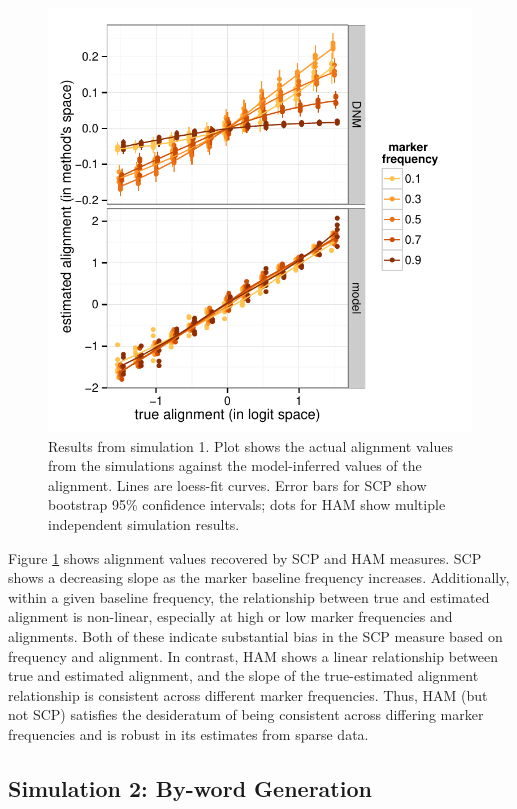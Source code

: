 \documentclass{acm_proc_article-sp}
\begin{document}
\begin{figure}[t]
\centering
\includegraphics[width=\columnwidth]{graphics/www2016_simulation1_crossiter.pdf}
\caption{Results from simulation 1. Plot shows the actual alignment values from the simulations against the model-inferred values of the alignment. Lines are loess-fit curves. Error bars for SCP show bootstrap 95\% confidence intervals; dots for HAM show multiple independent simulation results.}\label{fig:sim1}
\end{figure}

Figure \ref{fig:sim1} shows alignment values recovered by SCP and HAM measures. SCP shows a decreasing slope as the marker baseline frequency increases.  Additionally, within a given baseline frequency, the relationship between true and estimated alignment is non-linear, especially at high or low marker frequencies and alignments. Both of these indicate substantial bias in the SCP measure based on frequency and alignment. In contrast, HAM shows a linear relationship between true and estimated alignment, and the slope of the true-estimated alignment relationship is consistent across different marker frequencies.  Thus, HAM (but not SCP) satisfies the desideratum of being consistent across differing marker frequencies and is robust in its estimates from sparse data.

\subsection{Simulation 2: By-word Generation}
\end{document}

